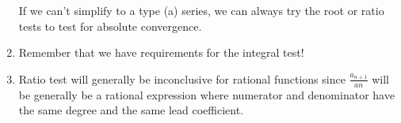 \documentclass[11pt]{article}
\begin{document}
\begin{enumerate}
        If we can't simplify to a type (a) series, we can always try the root or ratio tests to test for absolute convergence.

        \item Remember that we have requirements for the integral test!

        \item Ratio test will generally be inconclusive for rational functions since $\frac{a_{n+1}}{a{n}}$ will be generally be a rational expression where numerator and denominator have the same degree and the same lead coefficient.
    \end{enumerate}
\end{document}
